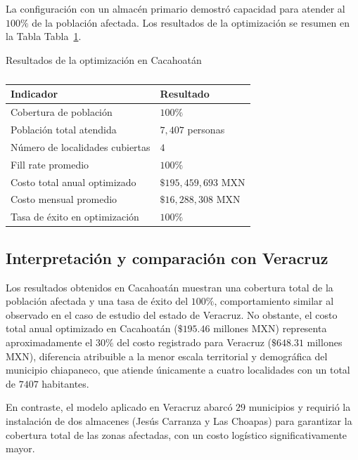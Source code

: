 \documentclass[
  spanish,
  us-letterpaper,
]{scrreprt}
\numberwithin{equation}{section}
\begin{document}
La configuración con un almacén primario demostró capacidad para atender
al \(100\%\) de la población afectada. Los resultados de la optimización
se resumen en la Tabla Tabla~\ref{tbl-optimizacion-cacahoatan}.

Resultados de la optimización en Cacahoatán

\begin{longtable}[]{@{}ll@{}}

\caption{\label{tbl-optimizacion-cacahoatan}}

\tabularnewline

\toprule\noalign{}
Indicador & Resultado \\
\midrule\noalign{}
\endhead
\bottomrule\noalign{}
\endlastfoot
Cobertura de población & \(100\%\) \\
Población total atendida & \(7,407\) personas \\
Número de localidades cubiertas & \(4\) \\
Fill rate promedio & \(100\%\) \\
Costo total anual optimizado & \(\$195,459,693\) MXN \\
Costo mensual promedio & \(\$16,288,308\) MXN \\
Tasa de éxito en optimización & \(100\%\) \\

\end{longtable}

\subsection{Interpretación y comparación con
Veracruz}\label{interpretaciuxf3n-y-comparaciuxf3n-con-veracruz}

Los resultados obtenidos en Cacahoatán muestran una cobertura total de
la población afectada y una tasa de éxito del \(100\%\), comportamiento
similar al observado en el caso de estudio del estado de Veracruz. No
obstante, el costo total anual optimizado en Cacahoatán (\(\$195.46\)
millones MXN) representa aproximadamente el \(30\%\) del costo
registrado para Veracruz (\(\$648.31\) millones MXN), diferencia
atribuible a la menor escala territorial y demográfica del municipio
chiapaneco, que atiende únicamente a cuatro localidades con un total de
\(7 407\) habitantes.

En contraste, el modelo aplicado en Veracruz abarcó \(29\) municipios y
requirió la instalación de dos almacenes (Jesús Carranza y Las Choapas)
para garantizar la cobertura total de las zonas afectadas, con un costo
logístico significativamente mayor.
\end{document}
